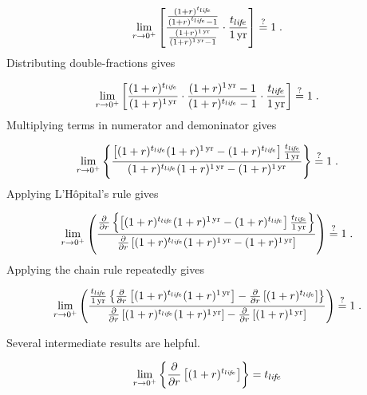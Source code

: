 \begin{equation}
  \lim_{r \to 0^+} \left[ \frac{\frac{(1 + r)^{t_{li\!f\!e}}}{(1 + r)^{t_{li\!f\!e}} - 1}}{\frac{(1 + r)^{1\,\mathrm{yr}}}{(1 + r)^{1\,\mathrm{yr}} - 1}} \cdot \frac{t_{li\!f\!e}}{1\,\mathrm{yr}} \right] \stackrel{?}{=} 1 \; .
\end{equation}
%
Distributing double-fractions gives

\begin{equation}
  \lim_{r \to 0^+} \left[
  \frac{(1 + r)^{t_{li\!f\!e}}}{(1 + r)^{1\,\mathrm{yr}}} \cdot
  \frac{(1 + r)^{1\,\mathrm{yr}} - 1}{(1 + r)^{t_{li\!f\!e}} - 1} \cdot
  \frac{t_{li\!f\!e}}{1\,\mathrm{yr}}
  \right] \stackrel{?}{=} 1 \; .
\end{equation}
%
Multiplying terms in numerator and demoninator gives

\begin{equation}
  \lim_{r \to 0^+} \left\{
  \frac{\left[(1 + r)^{\tlife} (1 + r)^{\oneyr} - (1 + r)^{\tlife} \right] \frac{\tlife}{\oneyr}}{(1 + r)^{\tlife} (1 + r)^{\oneyr} - (1 + r)^{\oneyr}}
  \right\} \questionequal 1 \; .
\end{equation}
%
Applying L'H\^{o}pital's rule gives

\begin{equation}
  \lim_{r \to 0^+} \left(
  \frac{\frac{\partial}{\partial r} \left\{ \left[(1 + r)^{\tlife} (1 + r)^{\oneyr} - (1 + r)^{\tlife} \right] \frac{\tlife}{\oneyr} \right\}}
  {\frac{\partial}{\partial r} \left[ (1 + r)^{\tlife} (1 + r)^{\oneyr} - (1 + r)^{\oneyr}\right]}
  \right) \questionequal 1 \; .
\end{equation}
%
Applying the chain rule repeatedly gives

\begin{equation}
  \lim_{r \to 0^+} \left(
  \frac{\frac{\tlife}{\oneyr} 
      \left\{ \frac{\partial}{\partial r} \left[  (1 + r)^{\tlife} (1 + r)^{\oneyr} \right]  - 
              \frac{\partial}{\partial r} \left[  (1 + r)^{\tlife} \right] 
      \right\}}
  {\frac{\partial}{\partial r} \left[    (1 + r)^{\tlife} (1 + r)^{\oneyr} \right]  - 
              \frac{\partial}{\partial r} \left[  (1 + r)^{\oneyr} \right] }
  \right) \questionequal 1 \; .
\end{equation}

Several intermediate results are helpful.

\begin{equation}
  \lim_{r \to 0^+} \left\{\frac{\partial}{\partial r} \left[ (1 + r)^{t_{li\!f\!e}} \right] \right\} = t_{li\!f\!e}
\end{equation}

